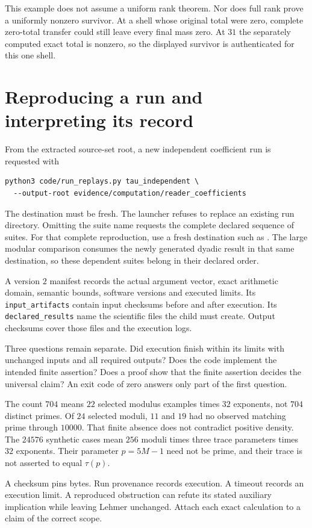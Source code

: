 This example does not assume a uniform rank theorem. Nor does full rank prove a uniformly nonzero survivor. At a shell whose original total were zero, complete zero-total transfer could still leave every final mass zero. At $31$ the separately computed exact total is nonzero, so the displayed survivor is authenticated for this one shell.

\section{Reproducing a run and interpreting its record}
\label{sec:workbook-manifests}

From the extracted source-set root, a new independent coefficient run is requested with
\begin{lstlisting}[basicstyle=\ttfamily\small,breaklines=true,frame=single,rulecolor=\color{Soft}]
python3 code/run_replays.py tau_independent \
  --output-root evidence/computation/reader_coefficients
\end{lstlisting}
The destination must be fresh. The launcher refuses to replace an existing run directory. Omitting the suite name requests the complete declared sequence of suites. For that complete reproduction, use a fresh destination such as . The large modular comparison consumes the newly generated dyadic result in that same destination, so these dependent suites belong in their declared order.

A version $2$ manifest records the actual argument vector, exact arithmetic domain, semantic bounds, software versions and executed limits. Its \texttt{input\_artifacts} contain input checksums before and after execution. Its \texttt{declared\_results} name the scientific files the child must create. Output checksums cover those files and the execution logs.

Three questions remain separate. Did execution finish within its limits with unchanged inputs and all required outputs? Does the code implement the intended finite assertion? Does a proof show that the finite assertion decides the universal claim? An exit code of zero answers only part of the first question.

The count $704$ means $22$ selected modulus examples times $32$ exponents, not $704$ distinct primes. Of $24$ selected moduli, $11$ and $19$ had no observed matching prime through $10000$. That finite absence does not contradict positive density. The $24576$ synthetic cases mean $256$ moduli times three trace parameters times $32$ exponents. Their parameter $p=5M-1$ need not be prime, and their trace is not asserted to equal $\tau(p)$.

A checksum pins bytes. Run provenance records execution. A timeout records an execution limit. A reproduced obstruction can refute its stated auxiliary implication while leaving Lehmer unchanged. Attach each exact calculation to a claim of the correct scope.
